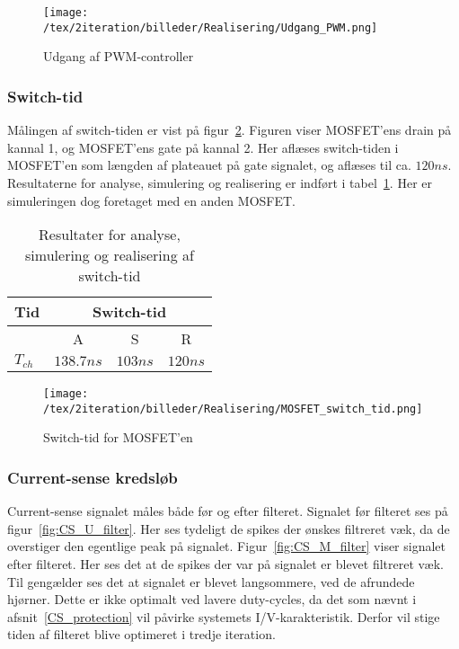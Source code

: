 \begin{figure}[H]
	\center
	\texttt{[image: /tex/2iteration/billeder/Realisering/Udgang\_PWM.png]}
	\caption{Udgang af PWM-controller}
	\label{fig:Udgang_PWM}
\end{figure} 

\subsubsection{Switch-tid}
Målingen af switch-tiden er vist på figur~\ref{fig:Realisering_MOSFET_switch_tid_2}. Figuren viser MOSFET'ens drain på kannal 1, og MOSFET'ens gate på kannal 2. Her aflæses switch-tiden i MOSFET'en som længden af plateauet på gate signalet, og aflæses til ca. $120ns$. Resultaterne for analyse, simulering og realisering er indført i tabel~\ref{tab:resultat_switch_tid_2}. Her er simuleringen dog foretaget med en anden MOSFET.

\begin{table}[H] 			
	\centering
	\begin{tabularx}{\textwidth}{|X|c|c|c|}
		\hline
		\textbf{Tid} & \multicolumn{3}{|c|}{\textbf{Switch-tid}} 										\\ \hline
		& A & S & R 									\\ \hline
		$T_{ch}$ & $138.7ns$ & $103ns$ & $120ns$ 									\\ \hline 
		
	\end{tabularx}
	\caption{Resultater for analyse, simulering og realisering af switch-tid}
	\label{tab:resultat_switch_tid_2}
\end{table}

 
\begin{figure}[H]
	\center
	\texttt{[image: /tex/2iteration/billeder/Realisering/MOSFET\_switch\_tid.png]}
	\caption{Switch-tid for MOSFET'en}
	\label{fig:Realisering_MOSFET_switch_tid_2}
\end{figure} 


\subsubsection{Current-sense kredsløb}
Current-sense signalet måles både før og efter filteret. Signalet før filteret ses på figur~\ref{fig:CS_U_filter}. Her ses tydeligt de spikes der ønskes filtreret væk, da de overstiger den egentlige peak på signalet. Figur~\ref{fig:CS_M_filter} viser signalet efter filteret. Her ses det at de spikes der var på signalet er blevet filtreret væk. Til gengælder ses det at signalet er blevet langsommere, ved de afrundede hjørner. Dette er ikke optimalt ved lavere duty-cycles, da det som nævnt i afsnit~\ref{CS_protection} vil påvirke systemets I/V-karakteristik. Derfor vil stige tiden af filteret blive optimeret i tredje iteration. 


